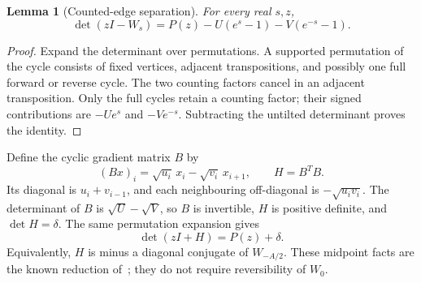 \documentclass[11pt,a4paper]{article}
\numberwithin{equation}{section}
\newtheorem{lemma}[theorem]{Lemma}
\theoremstyle{remark}
\newcommand{\Id}{I}
\begin{document}
\begin{lemma}[Counted-edge separation]\label{lem:det}
For every real $s,z$,
\begin{equation}\label{eq:tiltdet}
  \det(z\Id-W_s)=P(z)-U(e^s-1)-V(e^{-s}-1).
\end{equation}
\end{lemma}
\begin{proof}
Expand the determinant over permutations. A supported permutation of the
cycle consists of fixed vertices, adjacent transpositions, and possibly
one full forward or reverse cycle. The two counting factors cancel in an
adjacent transposition. Only the full cycles retain a counting factor;
their signed contributions are $-Ue^s$ and $-Ve^{-s}$. Subtracting the
untilted determinant proves the identity.
\end{proof}

Define the cyclic gradient matrix $B$ by
\begin{equation}\label{eq:gram}
  (Bx)_i=\sqrt{u_i}\,x_i-\sqrt{v_i}\,x_{i+1},\qquad H=B^TB.
\end{equation}
Its diagonal is $u_i+v_{i-1}$, and each neighbouring off-diagonal is
$-\sqrt{u_iv_i}$. The determinant of $B$ is $\sqrt U-\sqrt V$, so $B$ is
invertible, $H$ is positive definite, and $\det H=\delta$. The same
permutation expansion gives
\begin{equation}\label{eq:spectralshift}
  \det(z\Id+H)=P(z)+\delta.
\end{equation}
Equivalently, $H$ is minus a diagonal conjugate of $W_{-A/2}$.
These midpoint facts are the known reduction of~\cite[Appendix C]{Pietzonka2016};
they do not require reversibility of $W_0$.
\end{document}
